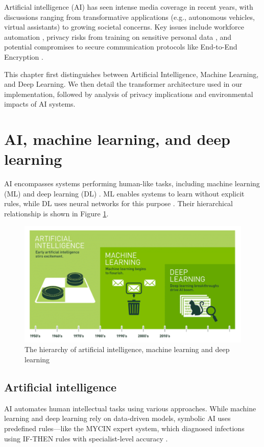 \documentclass[licencjacka,en]{pracamgr}
\begin{document}
Artificial intelligence (AI) has seen intense media coverage in recent years, with discussions ranging from transformative applications (e.g., autonomous vehicles, virtual assistants) to growing societal concerns. Key issues include workforce automation \cite{francuz}, privacy risks from training on sensitive personal data \cite{ibm_privacy}, and potential compromises to secure communication protocols like End-to-End Encryption \cite{E2EE}.

This chapter first distinguishes between Artificial Intelligence, Machine Learning, and Deep Learning. We then detail the transformer architecture used in our implementation, followed by analysis of privacy implications and environmental impacts of AI systems.

\section{AI, machine learning, and deep learning}
AI encompasses systems performing human-like tasks, including machine learning (ML) and deep learning (DL) \cite{ibm_ai,francuz}. ML enables systems to learn without explicit rules, while DL uses neural networks for this purpose \cite{ibm_ai}. Their hierarchical relationship is shown in Figure \ref{fig:hierarchy-ai-ml-dl}.

\begin{figure}
    \centering
    \includegraphics[width=0.5\linewidth]{bachelor_images/nvidia_ai_hierarchy.png}
    \caption{The hierarchy of artificial intelligence, machine learning and deep learning \cite{nvidiaimage}}
    \label{fig:hierarchy-ai-ml-dl}
\end{figure}

\subsection{Artificial intelligence}
AI automates human intellectual tasks using various approaches. While machine learning and deep learning rely on data-driven models, symbolic AI uses predefined rules—like the MYCIN expert system, which diagnosed infections using IF-THEN rules with specialist-level accuracy \cite{francuz, mycin}.
\end{document}
